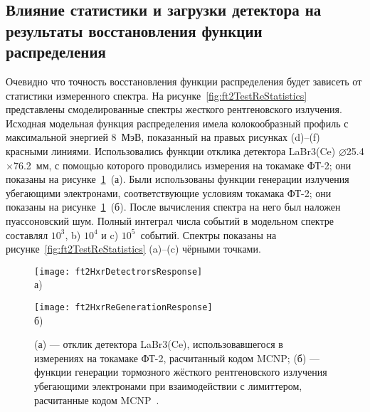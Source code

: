 
\subsection{ Влияние статистики и загрузки детектора на результаты восстановления функции распределения }

Очевидно что точность восстановления функции распределения будет зависеть от статистики измеренного спектра. На рисунке~\ref{fig:ft2TestReStatistics} представлены смоделированные спектры жесткого рентгеновского излучения. Исходная модельная функция распределения имела колокообразный профиль с максимальной энергией 8~МэВ, показанный на правых рисунках (d)--(f) красными линиями. Использовались функции отклика детектора LaBr3(Ce) $\varnothing$25.4$\times$76.2~мм, с помощью которого проводились измерения на токамаке ФТ-2; они показаны на рисунке~\ref{fig:ft2HxrDetectrorsAndReResponse}~(а). Были использованы функции генерации излучения убегающими электронами, соответствующие условиям токамака ФТ-2; они показаны на рисунке~\ref{fig:ft2HxrDetectrorsAndReResponse}~(б). После вычисления спектра на него был наложен пуассоновский шум. Полный интеграл числа событий в модельном спектре составлял $10^3$, b) $10^4$ и c) $10^5$~событий. Спектры показаны на рисунке~\ref{fig:ft2TestReStatistics} (a)--(c) чёрными точками.~\cite{Shevelev2016}

\begin{figure}[ht!]
    \begin{minipage}[b][][b]{0.45\linewidth}\centering
        \texttt{[image: ft2HxrDetectrorsResponse]} \\ а) \\
    \end{minipage}
    \hfill
    \begin{minipage}[b][][b]{0.45\linewidth}\centering
        \texttt{[image: ft2HxrReGenerationResponse]} \\ б) \\
    \end{minipage}
    \vspace{5mm}
    \caption{ (а) --- отклик детектора LaBr3(Ce), использовавшегося в измерениях на токамаке ФТ-2, расчитанный кодом MCNP; (б) --- функции генерации тормозного жёсткого рентгеновского излучения убегающими электронами при взаимодействии с лимиттером, расчитанные кодом MCNP~\cite{Shevelev2016}. }
    \label{fig:ft2HxrDetectrorsAndReResponse}
\end{figure}


